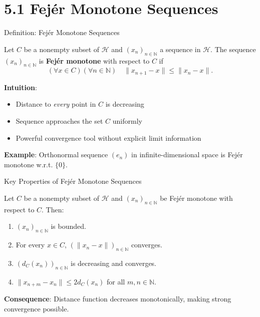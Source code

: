 \documentclass[aspectratio=169,10pt]{beamer}
\begin{document}
\section{5.1 Fejér Monotone Sequences}

\begin{frame}{Definition: Fejér Monotone Sequences}
    \begin{definition}
        Let $C$ be a nonempty subset of $\mathcal{H}$ and $(x_n)_{n \in \mathbb{N}}$ a sequence in $\mathcal{H}$.
        The sequence $(x_n)_{n \in \mathbb{N}}$ is \textbf{Fejér monotone} with respect to $C$ if
        \[
            (\forall x \in C)(\forall n \in \mathbb{N}) \quad \|x_{n+1} - x\| \leq \|x_n - x\|.
        \]
    \end{definition}

    \vspace{0.3cm}

    \textbf{Intuition}:
    \begin{itemize}
        \item Distance to \emph{every} point in $C$ is decreasing
        \item Sequence approaches the set $C$ uniformly
        \item Powerful convergence tool without explicit limit information
    \end{itemize}

    \vspace{0.3cm}

    \textbf{Example}: Orthonormal sequence $(e_n)$ in infinite-dimensional space is Fejér monotone w.r.t. $\{0\}$.
\end{frame}

\begin{frame}{Key Properties of Fejér Monotone Sequences}
    \begin{theorem}[Proposition 5.4]
        Let $C$ be a nonempty subset of $\mathcal{H}$ and $(x_n)_{n \in \mathbb{N}}$ be Fejér monotone with respect to $C$.
        Then:
        \begin{enumerate}
            \item $(x_n)_{n \in \mathbb{N}}$ is bounded.
            \item For every $x \in C$, $(\|x_n - x\|)_{n \in \mathbb{N}}$ converges.
            \item $(d_C(x_n))_{n \in \mathbb{N}}$ is decreasing and converges.
            \item $\|x_{n+m} - x_n\| \leq 2d_C(x_n)$ for all $m, n \in \mathbb{N}$.
        \end{enumerate}
    \end{theorem}

    \vspace{0.3cm}

    \textbf{Consequence}: Distance function decreases monotonically, making strong convergence possible.
\end{frame}
\end{document}
